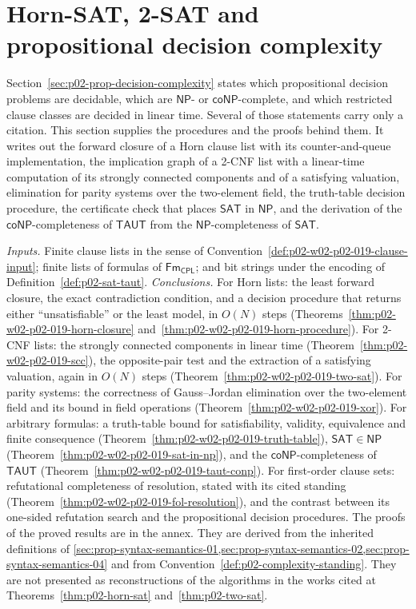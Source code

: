 \section{Horn-SAT, 2-SAT and propositional decision complexity}
\label{sec:p02-w02-p02-019-sat-procedures}

Section~\ref{sec:p02-prop-decision-complexity} states which propositional
decision problems are decidable, which are \(\mathsf{NP}\)- or
\(\mathsf{coNP}\)-complete, and which restricted clause classes are decided in
linear time.  Several of those statements carry only a citation.  This section
supplies the procedures and the proofs behind them.  It writes out the forward
closure of a Horn clause list with its counter-and-queue implementation, the
implication graph of a 2-CNF list with a linear-time computation of its
strongly connected components and of a satisfying valuation, elimination for
parity systems over the two-element field, the truth-table
decision procedure, the certificate check that places \(\mathsf{SAT}\) in
\(\mathsf{NP}\), and the derivation of the \(\mathsf{coNP}\)-completeness of
\(\mathsf{TAUT}\) from the \(\mathsf{NP}\)-completeness of \(\mathsf{SAT}\).

\emph{Inputs.} Finite clause lists in the sense of
Convention~\ref{def:p02-w02-p02-019-clause-input}; finite lists of formulas of
\(\mathsf{Fm}_{\mathsf{CPL}}\); and bit strings under the encoding of
Definition~\ref{def:p02-sat-taut}.
\emph{Conclusions.} For Horn lists: the least forward closure, the exact
contradiction condition, and a decision procedure that returns either
``unsatisfiable'' or the least model, in \(O(N)\) steps
(Theorems~\ref{thm:p02-w02-p02-019-horn-closure}
and~\ref{thm:p02-w02-p02-019-horn-procedure}).  For 2-CNF lists: the
strongly connected components in linear time
(Theorem~\ref{thm:p02-w02-p02-019-scc}), the opposite-pair test and the
extraction of a satisfying valuation, again in \(O(N)\) steps
(Theorem~\ref{thm:p02-w02-p02-019-two-sat}).  For parity systems: the
correctness of Gauss--Jordan elimination over the two-element field and its
bound in field operations (Theorem~\ref{thm:p02-w02-p02-019-xor}).  For arbitrary formulas: a
truth-table bound for satisfiability, validity, equivalence and finite
consequence (Theorem~\ref{thm:p02-w02-p02-019-truth-table}),
\(\mathsf{SAT}\in\mathsf{NP}\)
(Theorem~\ref{thm:p02-w02-p02-019-sat-in-np}), and the
\(\mathsf{coNP}\)-completeness of \(\mathsf{TAUT}\)
(Theorem~\ref{thm:p02-w02-p02-019-taut-conp}).  For first-order clause sets:
refutational completeness of resolution, stated with its cited standing
(Theorem~\ref{thm:p02-w02-p02-019-fol-resolution}), and the contrast between
its one-sided refutation search and the propositional decision procedures.
The proofs of the proved results are in the annex.  They are derived from the inherited definitions
of \cref{sec:prop-syntax-semantics-01,sec:prop-syntax-semantics-02,sec:prop-syntax-semantics-04}
and from Convention~\ref{def:p02-complexity-standing}.  They are not presented
as reconstructions of the algorithms in the works cited at
Theorems~\ref{thm:p02-horn-sat} and~\ref{thm:p02-two-sat}.

